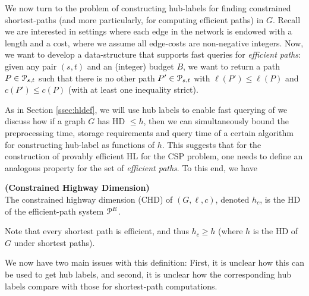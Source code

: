 We now turn to the problem of constructing hub-labels for finding constrained shortest-paths (and more particularly, for computing efficient paths) in $G$. 
Recall we are interested in settings where each edge in the network is endowed with a length and a cost, where we assume all edge-costs are non-negative integers.
Now, we want to develop a data-structure that supports fast queries for \emph{efficient paths}: given any pair $(s,t)$ and an (integer) budget $B$, we want to return a path $P\in \mathcal{P}_{s,t}$ such that there is no other path $P'\in \mathcal{P}_{s,t}$ with $\ell(P')\leq \ell(P)$ and $c(P')\leq c(P)$ (with at least one inequality strict). 


As in Section \ref{ssec:hldef}, we will use hub labels to enable fast querying of  we discuss how if a graph $G$ has HD $\leq h$, then we can simultaneously bound the preprocessing time, storage requirements and query time of a certain algorithm for constructing hub-label as functions of $h$.
This suggests that for the construction of provably efficient HL for the CSP problem, one needs to define an analogous property for the set of \emph{efficient paths}.
To this end, we have
\begin{definition}
\textbf{(Constrained Highway Dimension)}\\ The constrained highway dimension (CHD) of $(G,\ell,c)$, denoted $h_c$, is the HD of the efficient-path system $\mathcal{P}^E$.
\end{definition}
Note that every shortest path is efficient, and thus $h_c\geq h$ (where $h$ is the HD of $G$ under shortest paths).


We now have two main issues with this definition: First, it is unclear how this can be used to get hub labels, and second, it is unclear how the corresponding hub labels compare with those for shortest-path computations. 




